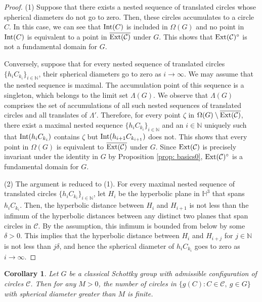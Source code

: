 \documentclass[12pt]{amsart}
\theoremstyle{plain}
\newtheorem{cor}[thm]{Corollary}
\DeclareMathOperator{\Int}{\rm Int}
\DeclareMathOperator{\Ext}{\rm Ext}
\begin{document}
\begin{proof}
(1) Suppose that there exists a nested sequence of translated circles whose
spherical diameters do not go to zero. Then, these circles accumulates to a circle $C$.
In this case, we can see that $\Int(C)$ is included in $\Omega(G)$ and
no point in $\Int(C)$ is equivalent to a point 
in $\overline{\Ext (\mathcal{C})}$ under $G$. This shows that $\Ext (\mathcal{C})^{\circ}$ is 
not a fundamental domain for $G$. 

Conversely, suppose that for every nested sequence of translated circles 
$\{h_i C_{k_i}\}_{i \in \mathbb N}$, their 
spherical diameters go to zero as $i \rightarrow \infty$. We may assume that the nested sequence is maximal.
The accumulation point of this sequence is a singleton, which belongs to the limit set $\Lambda(G)$.
We observe that $\Lambda(G)$ comprises the set of accumulations of all such nested sequences of
translated circles and all translates of $\Lambda'$. Therefore, for every point $\zeta$ in 
$\Omega(G) \setminus \overline{\Ext (\mathcal{C})}$,
there exist a maximal nested sequence $\{h_i C_{k_i}\}_{i \in \mathbb N}$ and an $i \in \mathbb N$ 
uniquely such that
$\Int(h_iC_{k_i})$ contains $\zeta$ but $\Int(h_{i+1}C_{k_{i+1}})$ does not.
This shows that every point in $\Omega(G)$ is equivalent to $\overline{\Ext (\mathcal{C})}$ under $G$.
Since $\Ext (\mathcal{C})$ is precisely invariant under the identity in $G$ by Proposition \ref{prop: basics0},
$\Ext (\mathcal{C})^{\circ}$ is a fundamental domain for $G$.

(2) The argument is reduced to (1). 
For every maximal nested sequence of translated circles $\{h_i C_{k_i}\}_{i \in \mathbb N}$,
let $H_i$ be the hyperbolic plane in $\mathbb H^3$ that spans $h_i C_{k_i}$. Then, the hyperbolic distance
between $H_i$ and $H_{i+1}$ is not less than the infimum of
the hyperbolic distances 
between any distinct two planes that span circles in $\mathcal{C}$. By the assumption, 
this infimum is bounded from below by some $\delta>0$. This implies that 
the hyperbolic distance
between $H_i$ and $H_{i+j}$ for $j \in \mathbb N$ is not less than $j\delta$, and hence the 
spherical diameter of $h_i C_{k_i}$ goes to zero as $i \rightarrow \infty$.
\end{proof}


\begin{cor}\label{fundamental}
Let $G$ be a classical Schottky group with admissible configuration of circles $\mathcal C$.
Then for any $M >0$, the number of circles in 
$\{g(C) : C \in \mathcal{C},\ g \in G\}$ with spherical diameter greater than
$M$ is finite. 
\end{cor}
\end{document}
